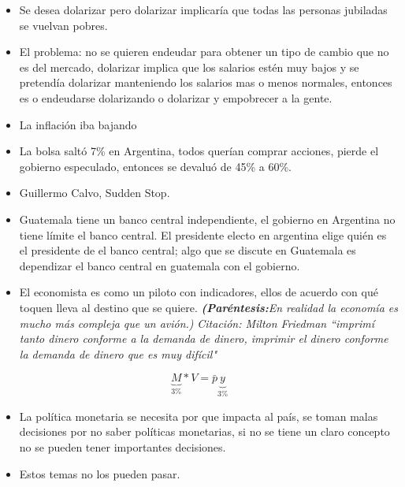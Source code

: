 \begin{itemize}
    \item Se desea dolarizar pero dolarizar implicaría que todas las personas jubiladas se vuelvan pobres.
    \item El problema: no se quieren endeudar para obtener un tipo de cambio que no es del mercado, dolarizar implica que los salarios estén muy bajos y se pretendía dolarizar manteniendo los salarios mas o menos normales, entonces es o endeudarse dolarizando o dolarizar y empobrecer a la gente.
    \item La inflación iba bajando
    \item La bolsa saltó 7\% en Argentina, todos querían comprar acciones, pierde el gobierno especulado, entonces se devaluó de 45\% a 60\%.
    \item Guillermo Calvo, Sudden Stop. 
    \item Guatemala tiene un banco central independiente, el gobierno en Argentina no tiene límite el banco central. El presidente electo en argentina elige quién es el presidente de el banco central; algo que se discute en Guatemala es dependizar el banco central en guatemala con el gobierno.
    \item El economista es como un piloto con indicadores, ellos de acuerdo con qué toquen lleva al destino que se quiere. \emph{\textbf{(Paréntesis:}En realidad la economía es mucho más compleja que un avión.)} \emph{Citación: Milton Friedman ``imprimí tanto dinero conforme a la demanda de dinero, imprimir el dinero conforme la demanda de dinero que es muy difícil"}
\end{itemize}

\[
  \underbrace{M}_{3\%}*V = \bar{p} \underbrace{y}_{3\%}
\]

\begin{itemize}
    \item La política monetaria se necesita por que impacta al país, se toman malas decisiones por no saber políticas monetarias, si no se tiene un claro concepto no se pueden tener importantes decisiones.
    \item Estos temas no los pueden pasar.
\end{itemize}
